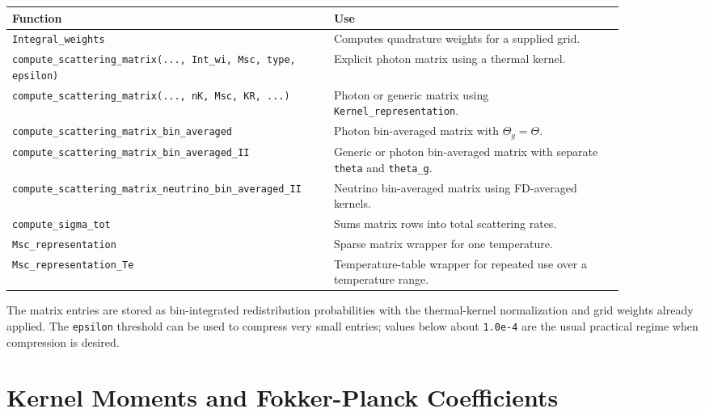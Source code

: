 \documentclass[11pt]{article}
\begin{document}
\begin{center}
\small
\begin{tabular}{L{0.44\linewidth}L{0.44\linewidth}}
\toprule
Function & Use \\
\midrule
\texttt{Integral\_weights} & Computes quadrature weights for a supplied grid. \\
\texttt{compute\_scattering\_matrix(..., Int\_wi, Msc, type, epsilon)} & Explicit photon matrix using a thermal kernel. \\
\texttt{compute\_scattering\_matrix(..., nK, Msc, KR, ...)} & Photon or generic matrix using \texttt{Kernel\_representation}. \\
\texttt{compute\_scattering\_matrix\_bin\_averaged} & Photon bin-averaged matrix with $\Theta_g=\Theta$. \\
\texttt{compute\_scattering\_matrix\_bin\_averaged\_II} & Generic or photon bin-averaged matrix with separate \texttt{theta} and \texttt{theta\_g}. \\
\texttt{compute\_scattering\_matrix\_neutrino\_bin\_averaged\_II} & Neutrino bin-averaged matrix using FD-averaged kernels. \\
\texttt{compute\_sigma\_tot} & Sums matrix rows into total scattering rates. \\
\texttt{Msc\_representation} & Sparse matrix wrapper for one temperature. \\
\texttt{Msc\_representation\_Te} & Temperature-table wrapper for repeated use over a temperature range. \\
\bottomrule
\end{tabular}
\end{center}

The matrix entries are stored as bin-integrated redistribution probabilities
with the thermal-kernel normalization and grid weights already applied. The
\texttt{epsilon} threshold can be used to compress very small entries; values
below about \texttt{1.0e-4} are the usual practical regime when compression is
desired.

\section{Kernel Moments and Fokker-Planck Coefficients}
\end{document}

